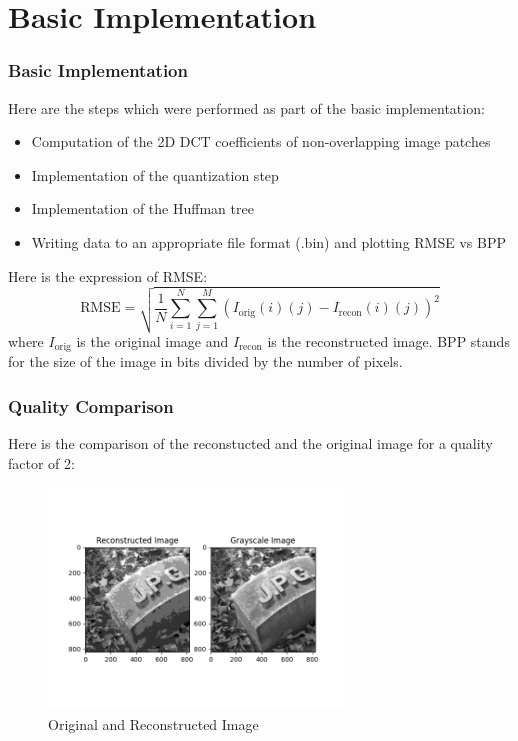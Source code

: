 \documentclass[Serif, 10pt, brown]{beamer}
\theoremstyle{example}
\theoremstyle{plain}
\begin{document}
\section{Basic Implementation}
\begin{frame}
	\frametitle{Basic Implementation}
	Here are the steps which were performed as part of the basic implementation:
	\begin{itemize}
		\item Computation of the 2D DCT coefficients of non-overlapping image patches
		\item Implementation of the quantization step
		\item Implementation of the Huffman tree
		\item Writing data to an appropriate file format (.bin) and plotting RMSE vs BPP
	\end{itemize}
	Here is the expression of RMSE:
	\begin{equation}
		\text{RMSE} = \sqrt{\frac{1}{N} \sum_{i=1}^{N}\sum_{j=1}^{M} (I_{\text{orig}}(i)(j) - I_{\text{recon}}(i)(j))^2}
	\end{equation}
	where $I_{\text{orig}}$ is the original image and $I_{\text{recon}}$ is the reconstructed image. BPP stands for the size of the image in bits divided by the number of pixels.
\end{frame}
\begin{frame}
	\frametitle{Quality Comparison}
	Here is the comparison of the reconstucted and the original image for a quality factor of 2:
	\begin{figure}
		\centering
		\includegraphics[width=0.7\textwidth]{../results/Quality: 2_comparison.png}
		\caption{Original and Reconstructed Image}
	\end{figure}
\end{frame}
\end{document}
